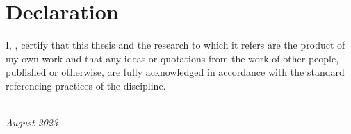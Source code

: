 \chapter*{Declaration}


I, \name, certify that this thesis and the research to which it refers are the product of my own work and that any ideas or quotations from the work of other people, published or otherwise, are fully acknowledged in accordance with the standard referencing practices of the discipline.

\begin{flushright}
\it \name\\
August 2023
\end{flushright}

